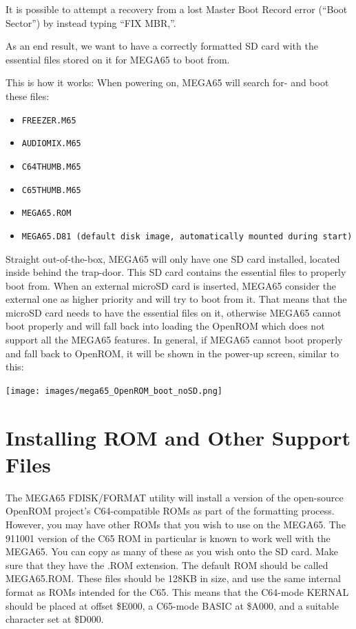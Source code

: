 It is possible to attempt a recovery from a lost Master Boot Record error (``Boot Sector'') by instead typing ``FIX MBR,''.


As an end result, we want to have a correctly formatted SD card with the essential files stored on it for MEGA65 to boot from.

This is how it works: When powering on, MEGA65 will search for- and boot these files:
\begin{itemize}
\item {\tt FREEZER.M65}
\item {\tt AUDIOMIX.M65}
\item {\tt C64THUMB.M65}
\item {\tt C65THUMB.M65}
\item {\tt MEGA65.ROM}
\item {\tt MEGA65.D81 (default disk image, automatically mounted during start)}
\end{itemize}

Straight out-of-the-box, MEGA65 will only have one SD card installed, located inside behind the trap-door. This SD card contains the essential files to properly boot from.
When an external microSD card is inserted, MEGA65 consider the external one as higher priority and will try to boot from it.
That means that the microSD card needs to have the essential files on it, otherwise MEGA65 cannot boot properly and will fall back into loading the OpenROM which does not support all the MEGA65 features.
In general, if MEGA65 cannot boot properly and fall back to OpenROM, it will be shown in the power-up screen, similar to this:

\texttt{[image: images/mega65\_OpenROM\_boot\_noSD.png]}


\section{Installing ROM and Other Support Files}
\label{sec:installingrometc}

The MEGA65 FDISK/FORMAT utility will install a version of the
open-source OpenROM project's C64-compatible ROMs as part of the
formatting process. However, you may have other ROMs that you wish to
use on the MEGA65. The 911001 version of the C65 ROM in
particular is known to work well with the MEGA65.
You can copy as many of these as you wish onto the
SD card.  Make sure that they have the .ROM extension.  The default ROM
should be called MEGA65.ROM.  These files
should be 128KB in size, and use the same internal format as ROMs
intended for the C65.  This means that the C64-mode KERNAL should be
placed at offset \$E000, a C65-mode BASIC at \$A000, and a suitable
character set at \$D000.  

